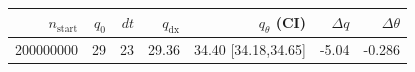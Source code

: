 \begin{tabular}{r r r r r r r}
\hline
$n_{\mathrm{start}}$ & $q_0$ & $dt$ & $q_{\mathrm{dx}}$ & $q_{\theta}$ (CI) & $\Delta q$ & $\Delta\theta$ \\
\hline
200000000 & 29 & 23 & 29.36 & 34.40 [34.18,34.65] & -5.04 & -0.286 \\
\hline
\end{tabular}

